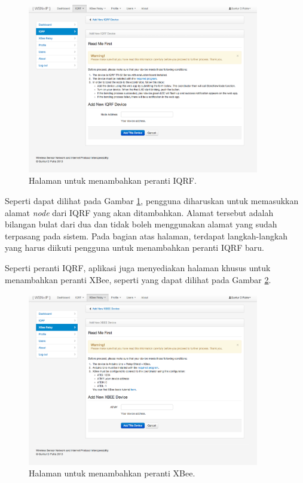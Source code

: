 				\begin{figure}[H]
				  \centering
				    \includegraphics[width=0.9\textwidth]{gambar/iqrf-add}
				    \caption{Halaman untuk menambahkan peranti IQRF.}
				    \label{iqrf-add}
				\end{figure}

			Seperti dapat dilihat pada Gambar \ref{iqrf-add}, pengguna diharuskan untuk memasukkan alamat \emph{node} dari IQRF yang akan ditambahkan. Alamat tersebut adalah bilangan bulat dari dua dan tidak boleh menggunakan alamat yang sudah terpasang pada sistem. Pada bagian atas halaman, terdapat langkah-langkah yang harus diikuti pengguna untuk menambahkan peranti IQRF baru.

			Seperti peranti IQRF, aplikasi juga menyediakan halaman khusus untuk menambahkan peranti XBee, seperti yang dapat dilihat pada Gambar \ref{xbee-add}.

				\begin{figure}[H]
				  \centering
				    \includegraphics[width=0.9\textwidth]{gambar/xbee-add}
				    \caption{Halaman untuk menambahkan peranti XBee.}
				    \label{xbee-add}
				\end{figure}


